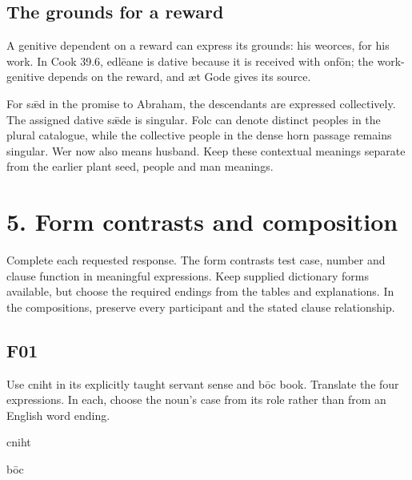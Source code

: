\subsection*{The grounds for a reward}

A genitive dependent on a reward can express its grounds: his weorces, for his work. In Cook 39.6, edlēane is dative because it is received with onfōn; the work-genitive depends on the reward, and æt Gode gives its source.

For sǣd in the promise to Abraham, the descendants are expressed collectively. The assigned dative sǣde is singular. Folc can denote distinct peoples in the plural catalogue, while the collective people in the dense horn passage remains singular. Wer now also means husband. Keep these contextual meanings separate from the earlier plant seed, people and man meanings.

\section*{5. Form contrasts and composition}

Complete each requested response. The form contrasts test case, number and clause function in meaningful expressions. Keep supplied dictionary forms available, but choose the required endings from the tables and explanations. In the compositions, preserve every participant and the stated clause relationship.

\subsection*{F01}

Use cniht in its explicitly taught servant sense and bōc book. Translate the four expressions. In each, choose the noun's case from its role rather than from an English word ending.

cniht

bōc

